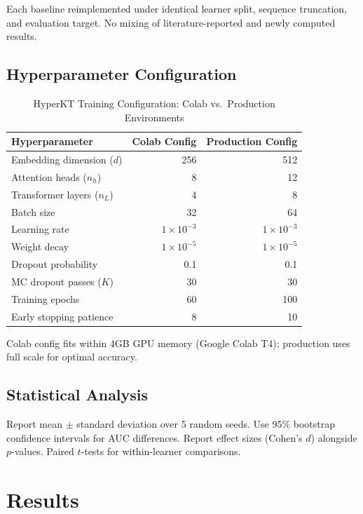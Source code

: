 \documentclass[preprint,12pt]{elsarticle}
\begin{document}
Each baseline reimplemented under identical learner split, sequence truncation, and evaluation target. No mixing of literature-reported and newly computed results.

\subsection{Hyperparameter Configuration}

\begin{table}[H]\centering
\caption{HyperKT Training Configuration: Colab vs.~Production Environments}\label{tab:config}
\small
\begin{tabularx}{\linewidth}{@{\extracolsep{\fill}}lrr@{}}\toprule
\textbf{Hyperparameter} & \textbf{Colab Config} & \textbf{Production Config}\\\midrule
Embedding dimension ($d$) & 256 & 512\\
Attention heads ($n_h$) & 8 & 12\\
Transformer layers ($n_L$) & 4 & 8\\
Batch size & 32 & 64\\
Learning rate & $1 \times 10^{-3}$ & $1 \times 10^{-3}$\\
Weight decay & $1 \times 10^{-5}$ & $1 \times 10^{-5}$\\
Dropout probability & 0.1 & 0.1\\
MC dropout passes ($K$) & 30 & 30\\
Training epochs & 60 & 100\\
Early stopping patience & 8 & 10\\
\bottomrule\end{tabularx}
\end{table}

Colab config fits within 4GB GPU memory (Google Colab T4); production uses full scale for optimal accuracy.

\subsection{Statistical Analysis}

Report mean $\pm$ standard deviation over 5 random seeds. Use 95\% bootstrap confidence intervals for AUC differences. Report effect sizes (Cohen's $d$) alongside $p$-values. Paired $t$-tests for within-learner comparisons.

\section{Results}\label{sec:results}
\end{document}
